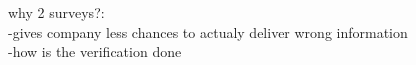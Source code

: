why 2 surveys?:\\
-gives company less chances to actualy deliver wrong information\\
-how is the verification done\\
